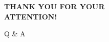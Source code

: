 \documentclass[aspectratio=43,10pt]{beamer}
\begin{document}
\begin{hustreferencesframe}[from=1, to=2]
\end{hustreferencesframe}

\begin{hustreferencesframe}[from=3, to=4]
\end{hustreferencesframe}

\begin{hustdarkframe}
  \centering
  \vspace*{0.2\paperheight}
  {\Huge\bfseries\color{white} THANK YOU FOR YOUR\\ATTENTION!\par}
  \vspace{1.5em}
  {\large\color{white!85} Q \& A\par}
\end{hustdarkframe}
\end{document}
